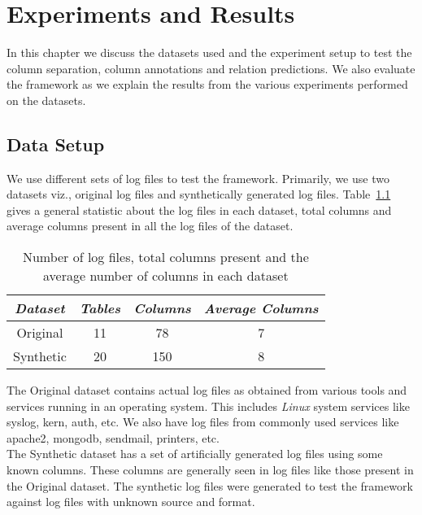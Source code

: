 \chapter{Experiments and Results}
\thispagestyle{plain}
\label {Experiments and Results}

In this chapter we discuss the datasets used and the experiment setup to test the column separation, column annotations and relation predictions. We also evaluate the framework as we explain the results from the various experiments performed on the datasets.


\section{Data Setup}
We use different sets of log files to test the framework. Primarily, we use two datasets viz., original log files and synthetically generated log files. Table~\ref{table:dataset_distribution} gives a general statistic about the log files in each dataset, total columns and average columns present in all the log files of the dataset.

\begin{table}[htbp]
\caption{Number of log files, total columns present and the average number of columns in each dataset}
\bigskip
\label{table:dataset_distribution}
\centering
\begin{center}
\def\arraystretch{1.8}
\begin{tabular}{|@{\hskip 1cm}c@{\hskip 1cm}|c|c|c|}
\hline
\textit{Dataset} & \textit{Tables} & \textit{Columns} & \textit{Average Columns}\\ 
\hline
Original & 11 & 78 & 7\\
\hline
Synthetic & 20 & 150 & 8\\ 
\hline
\end{tabular}
\end{center}
\end{table}

The Original dataset contains actual log files as obtained from various tools and services running in an operating system. This includes \textit{Linux} system services like syslog, kern, auth, etc. We also have log files from commonly used services like apache2, mongodb, sendmail, printers, etc.
\\

The Synthetic dataset has a set of artificially generated log files using some known columns. These columns are generally seen in log files like those present in the Original dataset. The synthetic log files were generated to test the framework against log files with unknown source and format.

